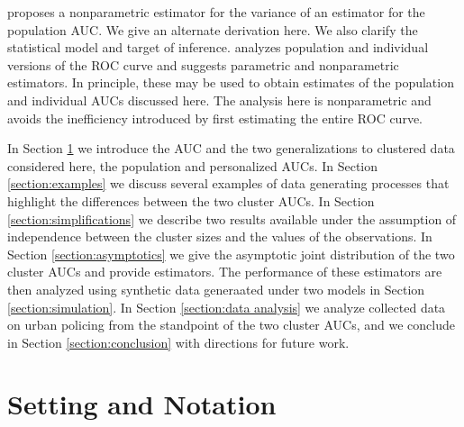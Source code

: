 \documentclass[12pt]{article}
\newcommand{\comment}[1]{
  \iftoggle{commenttoggle}{
    {\normalsize{\color{red}{ #1}}\normalsize}
  }
  {}
}
\begin{document}
\cite{obuchowski1997} proposes a nonparametric estimator for the
variance of an estimator for the population AUC. We give an alternate
derivation here. We also clarify the statistical model and target of
inference. \cite{michael2019} analyzes population and individual
versions of the ROC curve and suggests parametric and nonparametric
estimators. In principle, these may be used to obtain estimates of the
population and individual AUCs discussed here. The analysis here is
nonparametric and avoids the inefficiency introduced by first estimating the entire ROC curve.%

In Section \ref{section:setting} we introduce the AUC
and the two generalizations to clustered data considered here, the
population and personalized AUCs. In Section \ref{section:examples} we
discuss several examples of data generating processes that highlight
the differences between the two cluster AUCs. In Section
\ref{section:simplifications} we describe two results available under
the assumption of independence between the cluster sizes and the
values of the observations. In Section \ref{section:asymptotics} we
give the asymptotic joint distribution of the two cluster AUCs and
provide estimators. The performance of these estimators are then
analyzed using synthetic data generaated under two models in Section
\ref{section:simulation}. In Section \ref{section:data analysis} we
analyze collected data on urban policing from the standpoint of the
two cluster AUCs, and we conclude in Section \ref{section:conclusion}
with directions for future work.


\section{Setting and Notation}\label{section:setting}
\end{document}
